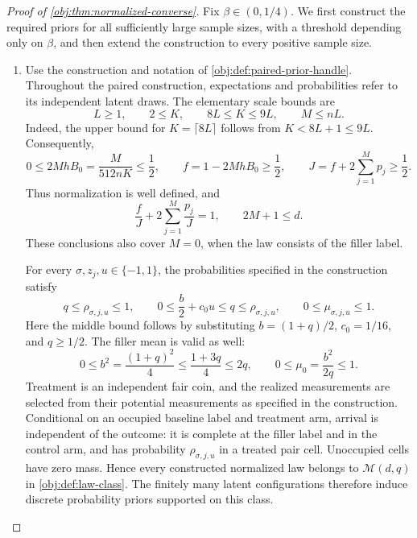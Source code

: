 \begin{proof}[Proof of \cref{obj:thm:normalized-converse}]
Fix \(\beta\in(0,1/4)\). We first construct the required priors for all sufficiently large sample sizes, with a threshold depending only on \(\beta\), and then extend the construction to every positive sample size.

\begin{enumerate}
\item
Use the construction and notation of
\cref{obj:def:paired-prior-handle}. Throughout the paired construction, expectations and probabilities refer to its independent latent draws. The elementary scale bounds are
\[
L\ge1,\qquad 2\le K,\qquad 8L\le K\le9L,\qquad M\le nL.
\]
Indeed, the upper bound for \(K=\lceil8L\rceil\) follows from
\(K<8L+1\le9L\). Consequently,
\[
0\le 2MhB_0=\frac{M}{512nK}\le\frac12,
\qquad
f=1-2MhB_0\ge\frac12,
\qquad
J=f+2\sum_{j=1}^{M}p_j\ge\frac12.
\]
Thus normalization is well defined, and
\[
\frac fJ+2\sum_{j=1}^{M}\frac{p_j}{J}=1,
\qquad
2M+1\le d.
\]
These conclusions also cover \(M=0\), when the law consists of the filler label.

For every \(\sigma,z_j,u\in\{-1,1\}\), the probabilities specified in the construction satisfy
\[
q\le \rho_{\sigma,j,u}\le1,
\qquad
0\le \frac b2+c_0u\le q\le\rho_{\sigma,j,u},
\qquad
0\le\mu_{\sigma,j,u}\le1.
\]
Here the middle bound follows by substituting
\(b=(1+q)/2\), \(c_0=1/16\), and \(q\ge1/2\).
The filler mean is valid as well:
\[
0\le b^2=\frac{(1+q)^2}{4}
\le\frac{1+3q}{4}\le2q,
\qquad
0\le\mu_0=\frac{b^2}{2q}\le1.
\]
Treatment is an independent fair coin, and the realized measurements are selected from their potential measurements as specified in the construction. Conditional on an occupied baseline label and treatment arm, arrival is independent of the outcome: it is complete at the filler label and in the control arm, and has probability \(\rho_{\sigma,j,u}\) in a treated pair cell. Unoccupied cells have zero mass. Hence every constructed normalized law belongs to
\(\mathcal M(d,q)\) in \cref{obj:def:law-class}. The finitely many latent configurations therefore induce discrete probability priors supported on this class.


\end{enumerate}
\end{proof}

